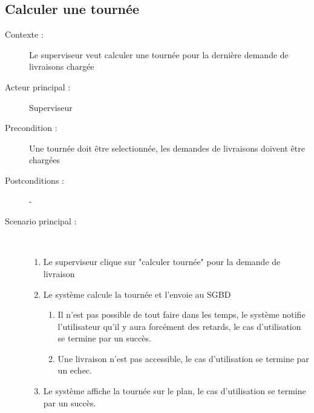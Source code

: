 \subsection{Calculer une tourn\'ee}
\begin{description}
    \item[Contexte :] Le superviseur veut calculer une tourn\'ee pour la derni\`ere demande de livraisons charg\'ee
    \item[Acteur principal :] Superviseur
    \item[Precondition :] Une tourn\'ee doit \^etre selectionn\'ee, les demandes de livraisons doivent \^etre charg\'ees
    \item[Postconditions :] -
    \item[Scenario principal :] ~
    \begin{enumerate}
        \item Le superviseur clique sur "calculer tourn\'ee" pour la demande de livraison
        \item Le syst\`eme calcule la tourn\'ee et l'envoie au SGBD
        \begin{enumerate}
            \item Il n'est pas possible de tout faire dans les temps, le syst\`eme notifie l'utilisateur qu'il y aura forc\'ement des retards, le cas d'utilisation se termine par un succ\`es.
            \item Une livraison n'est pas accessible, le cas d'utilisation se termine par un echec.
        \end{enumerate}
        \item Le syst\`eme affiche la tourn\'ee sur le plan, le cas d'utilisation se termine par un succ\`es.
    \end{enumerate}
\end{description}
\pagebreak

